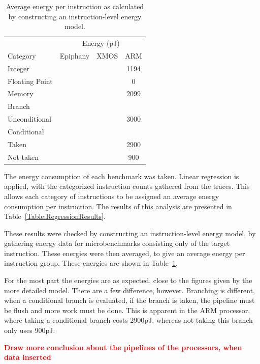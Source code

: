 \documentclass[twocolumn]{article}
\newcommand{\todo}[1]{\textbf{\textcolor{red}{#1}}}
\begin{document}
\begin{table}
	\centering
	\begin{tabular}{l c c c}
						& \multicolumn{3}{c}{Energy (pJ)}\\
		Category 		& Epiphany 	& XMOS 	& ARM  	\\
		\hline
		Integer 		&			&		& 1194 	\\
		Floating Point 	&			&		& 0		\\
		Memory			&			&		& 2099	\\
		Branch  		&			&		& 	\\
		\null\hspace{3mm}Unconditional  &			&		& 3000	\\
		\null\hspace{3mm}Conditional 	&			&		& 	\\
		\null\hspace{6mm}Taken  		&			&		& 2900	\\
		\null\hspace{6mm}Not taken  	&			&		& 900	\\
	\end{tabular}
	\caption{Average energy per instruction as calculated by constructing an instruction-level energy model.}
	\label{Table:IModelResults}
\end{table}

The energy consumption of each benchmark was taken. Linear regression is applied, with the categorized instruction counts gathered from the traces. This allows each category of instructions to be assigned an average energy consumption per instruction. The results of this analysis are presented in Table~\ref{Table:RegressionResults}.

These results were checked by constructing an instruction-level energy model, by gathering energy data for microbenchmarks consisting only of the target instruction. These energies were then averaged, to give an average energy per instruction group. These energies are shown in Table~\ref{Table:IModelResults}.

For the most part the energies are as expected, close to the figures given by the more detailed model. There are a few difference, however. Branching is different, when a conditional branch is evaluated, if the branch is taken, the pipeline must be flush and more work must be done. This is apparent in the ARM processor, where taking a conditional branch costs 2900pJ, whereas not taking this branch only uses 900pJ.

\todo{Draw more conclusion about the pipelines of the processors, when data inserted}
\end{document}
